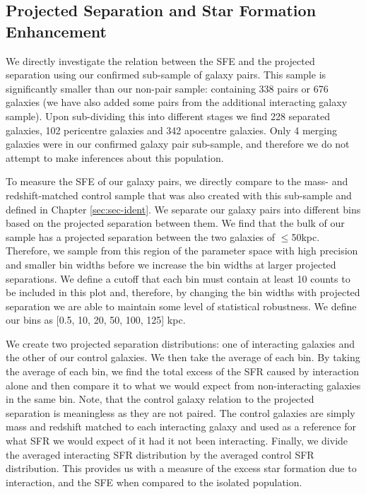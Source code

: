 \subsection{Projected Separation and Star Formation Enhancement}
\noindent We directly investigate the relation between the SFE and the projected separation using our confirmed sub-sample of galaxy pairs. This sample is significantly smaller than our non-pair sample: containing 338 pairs or 676 galaxies (we have also added some pairs from the additional interacting galaxy sample). Upon sub-dividing this into different stages we find 228 separated galaxies, 102 pericentre galaxies and 342 apocentre galaxies. Only 4 merging galaxies were in our confirmed galaxy pair sub-sample, and therefore we do not attempt to make inferences about this population. 

To measure the SFE of our galaxy pairs, we directly compare to the mass- and redshift-matched control sample that was also created with this sub-sample and defined in Chapter \ref{sec:sec-ident}. We separate our galaxy pairs into different bins based on the projected separation between them. We find that the bulk of our sample has a projected separation between the two galaxies of $\leq$50kpc. Therefore, we sample from this region of the parameter space with high precision and smaller bin widths before we increase the bin widths at larger projected separations. We define a cutoff that each bin must contain at least 10 counts to be included in this plot and, therefore, by changing the bin widths with projected separation we are able to maintain some level of statistical robustness. We define our bins as [0.5, 10, 20, 50, 100, 125] kpc.

We create two projected separation distributions: one of interacting galaxies and the other of our control galaxies. We then take the average of each bin. By taking the average of each bin, we find the total excess of the SFR caused by interaction alone and then compare it to what we would expect from non-interacting galaxies in the same bin. Note, that the control galaxy relation to the projected separation is meaningless as they are not paired. The control galaxies are simply mass and redshift matched to each interacting galaxy and used as a reference for what SFR we would expect of it had it not been interacting. Finally, we divide the averaged interacting SFR distribution by the averaged control SFR distribution. This provides us with a measure of the excess star formation due to interaction, and the SFE when compared to the isolated population.

